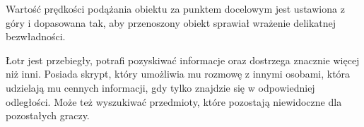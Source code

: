 Wartość prędkości podążania obiektu za punktem docelowym jest ustawiona z góry i dopasowana tak, aby przenoszony obiekt sprawiał wrażenie delikatnej bezwładności.


Łotr jest przebiegły, potrafi pozyskiwać informacje oraz dostrzega znacznie więcej niż inni. Posiada skrypt, który umożliwia mu rozmowę z innymi osobami, która udzielają mu cennych informacji, gdy tylko znajdzie się w odpowiedniej odległości. Może też wyszukiwać przedmioty, które pozostają niewidoczne dla pozostałych graczy.
